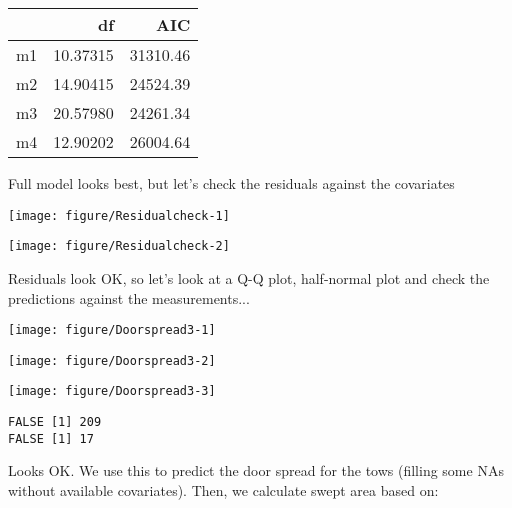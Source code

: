 \documentclass[12pt]{article}\usepackage[]{graphicx}\usepackage[]{color}
\makeatletter
\def\maxwidth{ %
  \ifdim\Gin@nat@width>\linewidth
    \linewidth
  \else
    \Gin@nat@width
  \fi
}
\newenvironment{kframe}{%
 \def\at@end@of@kframe{}%
 \ifinner\ifhmode%
  \def\at@end@of@kframe{\end{minipage}}%
  \begin{minipage}{\columnwidth}%
 \fi\fi%
 \def\FrameCommand##1{\hskip\@totalleftmargin \hskip-\fboxsep
 \colorbox{shadecolor}{##1}\hskip-\fboxsep
     \hskip-\linewidth \hskip-\@totalleftmargin \hskip\columnwidth}%
 \MakeFramed {\advance\hsize-\width
   \@totalleftmargin\z@ \linewidth\hsize
   \@setminipage}}%
 {\par\unskip\endMakeFramed%
 \at@end@of@kframe}
\newenvironment{knitrout}{}{} %
\makeatother
\begin{document}
\begin{tabular}{l|r|r}
\hline
  & df & AIC\\
\hline
m1 & 10.37315 & 31310.46\\
\hline
m2 & 14.90415 & 24524.39\\
\hline
m3 & 20.57980 & 24261.34\\
\hline
m4 & 12.90202 & 26004.64\\
\hline
\end{tabular}



Full model looks best, but let's check the residuals against the covariates
\begin{knitrout}\footnotesize
{}\color{fgcolor}

{\centering \texttt{[image: figure/Residualcheck-1]} 

}




{\centering \texttt{[image: figure/Residualcheck-2]} 

}



\end{knitrout}

Residuals look OK, so let's look at a Q-Q plot, half-normal plot and check the
predictions against the measurements...

\begin{knitrout}\footnotesize
{}\color{fgcolor}

{\centering \texttt{[image: figure/Doorspread3-1]} 

}




{\centering \texttt{[image: figure/Doorspread3-2]} 

}




{\centering \texttt{[image: figure/Doorspread3-3]} 

}


\begin{kframe}\begin{verbatim}
FALSE [1] 209
FALSE [1] 17
\end{verbatim}
\end{kframe}
\end{knitrout}

Looks OK.  We use this to predict the door spread for the tows (filling some
NAs without available covariates). Then, we calculate swept area based on:
\end{document}
